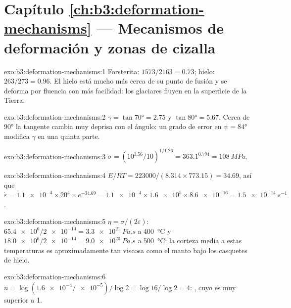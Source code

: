 \section*{Capítulo \ref{ch:b3:deformation-mechanisms} --- Mecanismos de deformación y zonas de cizalla}

\begin{solution}{exo:b3:deformation-mechanisms:1}
Forsterita: $1573/2163 = 0.73$; hielo: $263/273 = 0.96$. El hielo está mucho más cerca de
su punto de fusión y se deforma por fluencia con más facilidad: los glaciares
fluyen en la superficie de la Tierra.
\end{solution}

\begin{solution}{exo:b3:deformation-mechanisms:2}
$\gamma = \tan\ang{70} = 2.75$ y $\tan\ang{80} = 5.67$. Cerca de \ang{90} la
tangente cambia muy deprisa con el ángulo: un grado de error en $\psi =
\ang{84}$ modifica $\gamma$ en una quinta parte.
\end{solution}

\begin{solution}{exo:b3:deformation-mechanisms:3}
$\sigma = (10^{3.56}/10)^{1/1.26} = 363.1^{0.794} = \qty{108}{MPa}$.
\end{solution}

\begin{solution}{exo:b3:deformation-mechanisms:4}
$E/RT = 223000/(8.314\times773.15) = 34.69$, así que $\dot\varepsilon =
\num{1.1e-4}\times20^4\times e^{-34.69} = \num{1.1e-4}\times\num{1.6e5}\times
\num{8.6e-16} = \qty{1.5e-14}{s^{-1}}$.
\end{solution}

\begin{solution}{exo:b3:deformation-mechanisms:5}
$\eta = \sigma/(2\dot\varepsilon)$: $\num{65.4e6}/\num{2e-14} =
\qty{3.3e21}{Pa.s}$ a \qty{400}{\celsius} y $\num{18.0e6}/\num{2e-14} =
\qty{9.0e20}{Pa.s}$ a \qty{500}{\celsius}: la corteza media a estas
temperaturas es aproximadamente tan viscosa como el manto bajo los casquetes de hielo.
\end{solution}

\begin{solution}{exo:b3:deformation-mechanisms:6}
$n = \log(\num{1.6e-4}/\num{e-5})/\log2 = \log16/\log2 = 4$: ,
cuyo  es muy superior a 1.
\end{solution}

